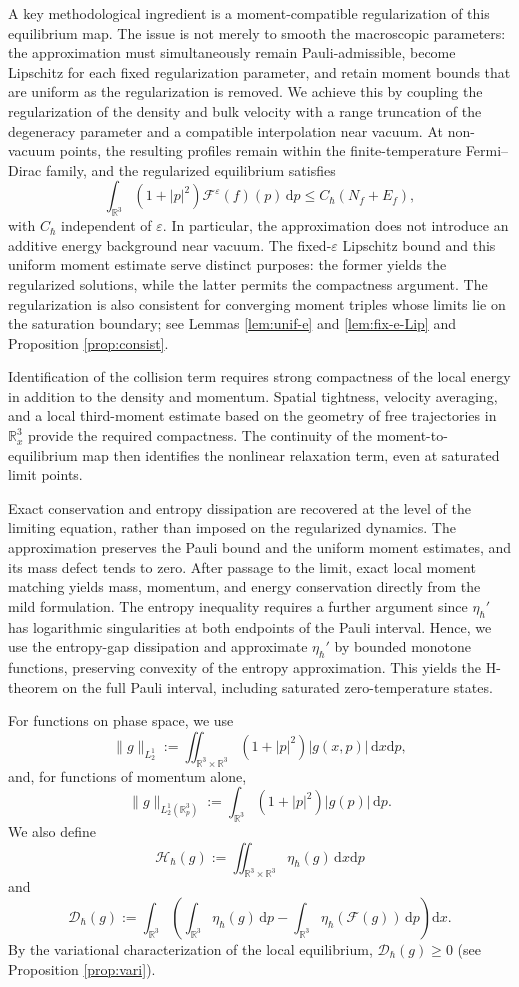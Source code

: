 \documentclass[10pt,reqno]{amsart}
\numberwithin{equation}{section}
\theoremstyle{definition}
\newcommand{\R}{\mathbb R}
\newcommand{\dx}{\mathrm{d}x}
\newcommand{\dpp}{\mathrm{d}p}
\newcommand{\e}{\varepsilon}
\newcommand{\calF}{\mathcal F}
\newcommand{\bq}{\begin{equation}}
\newcommand{\eq}{\end{equation}}
\newcommand{\lt}{\left}
\newcommand{\rt}{\right}
\begin{document}
A key methodological ingredient is a moment-compatible regularization of this equilibrium map. The issue is not merely to smooth the macroscopic parameters: the approximation must simultaneously remain Pauli-admissible, become Lipschitz for each fixed regularization parameter, and retain moment bounds that are uniform as the regularization is removed. We achieve this by coupling the regularization of the density and bulk velocity with a range truncation of the degeneracy parameter and a compatible interpolation near vacuum. At non-vacuum points, the resulting profiles remain within the finite-temperature Fermi--Dirac family, and the regularized equilibrium satisfies
\[
 \int_{\R^3}(1+|p|^2)\calF^\e(f)(p)\,\dpp \leq C_\hbar(N_f+E_f),
\]
with $C_\hbar$ independent of $\e$. In particular, the approximation does not introduce an additive energy background near vacuum. The fixed-$\e$ Lipschitz bound and this uniform moment estimate serve distinct purposes: the former yields the regularized solutions, while the latter permits the compactness argument. The regularization is also consistent for converging moment triples whose limits lie on the saturation boundary; see Lemmas \ref{lem:unif-e} and \ref{lem:fix-e-Lip} and Proposition \ref{prop:consist}.

Identification of the collision term requires strong compactness of the local energy in addition to the density and momentum. Spatial tightness, velocity averaging, and a local third-moment estimate based on the geometry of free trajectories in $\R_x^3$ provide the required compactness. The continuity of the moment-to-equilibrium map then identifies the nonlinear relaxation term, even at saturated limit points.

Exact conservation and entropy dissipation are recovered at the level of the limiting equation, rather than imposed on the regularized dynamics. The approximation preserves the Pauli bound and the uniform moment estimates, and its mass defect tends to zero. After passage to the limit, exact local moment matching yields mass, momentum, and energy conservation directly from the mild formulation. The entropy inequality requires a further argument since $\eta_\hbar'$ has logarithmic singularities at both endpoints of the Pauli interval. Hence, we use the entropy-gap dissipation and approximate $\eta_\hbar'$ by bounded monotone functions, preserving convexity of the entropy approximation. This yields the H-theorem on the full Pauli interval, including saturated zero-temperature states.


For functions on phase space, we use
\[
 \|g\|_{L^1_2}  :=  \iint_{\R^3\times\R^3}  (1+|p|^2)|g(x,p)|\,\dx\dpp,
\]
and, for functions of momentum alone,
\[
 \|g\|_{L^1_2(\R^3_p)}  :=  \int_{\R^3}(1+|p|^2)|g(p)|\,\dpp.
\]
We also define
\bq \label{eq:H-def}
 \mathscr H_\hbar(g)  :=  \iint_{\R^3\times\R^3}  \eta_\hbar(g)\,\dx\dpp
\eq
and
\bq \label{eq:D-def}
 \mathscr D_\hbar(g)  :=  \int_{\R^3}  \lt(  \int_{\R^3}\eta_\hbar(g)\,\dpp  -  \int_{\R^3}\eta_\hbar(\calF(g))\,\dpp  \rt)\dx.
\eq
By the variational characterization of the local equilibrium, $\mathscr D_\hbar(g)\geq0$ (see Proposition \ref{prop:vari}).
\end{document}
